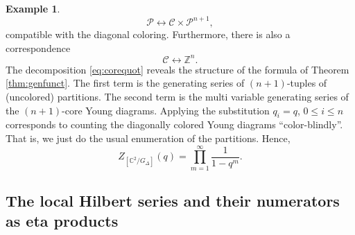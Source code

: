 \documentclass[11pt,a4paper]{amsart}
\newtheorem{corollary}[theorem]{Corollary}
\theoremstyle{definition}
\newtheorem{example}[theorem]{Example}
\newcommand{\SZ}{\mathbb{Z}}                    %
\newcommand{\SC}{\mathbb{C}}                    %
\begin{document}
\begin{example}
\begin{equation}\label{eq:corequot} {\mathcal P} \longleftrightarrow {\mathcal C} \times {\mathcal P}^{n+1}, \end{equation}
 compatible with the diagonal coloring. Furthermore, there is also a correspondence
 \begin{equation*}\label{typeA-cores} 
{\mathcal C} \longleftrightarrow \SZ^{n}. \end{equation*}
The decomposition \eqref{eq:corequot} reveals the structure of the
formula of Theorem \ref{thm:genfunct}. The first term is the generating series of $(n+1)$-tuples of 
(uncolored) partitions. The second term is the multi variable generating series of the $(n+1)$-core Young diagrams. Applying the substitution $q_i=q$, $0 \leq i \leq n$ corresponds to counting the diagonally colored Young diagrams ``color-blindly''. That is, we just do the usual enumeration of the partitions. Hence,
\[ Z_{[\SC^2/G_\Delta]}(q)=\prod_{m=1}^{\infty}\frac{1}{1-q^m}.\]
\end{example}



\subsection{The local Hilbert series and their numerators as eta products}
\end{document}
